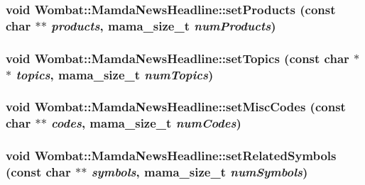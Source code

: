 \hypertarget{classWombat_1_1MamdaNewsHeadline_945dfa7210ec4375fad51c8657b0f96c}{
\subsubsection[setProducts]{\setlength{\rightskip}{0pt plus 5cm}void Wombat::Mamda\-News\-Headline::set\-Products (const char $\ast$$\ast$ {\em products}, mama\_\-size\_\-t {\em num\-Products})}}
\label{classWombat_1_1MamdaNewsHeadline_945dfa7210ec4375fad51c8657b0f96c}


\hypertarget{classWombat_1_1MamdaNewsHeadline_ba36d23a26fe7381aa2646834fb8c747}{
\subsubsection[setTopics]{\setlength{\rightskip}{0pt plus 5cm}void Wombat::Mamda\-News\-Headline::set\-Topics (const char $\ast$$\ast$ {\em topics}, mama\_\-size\_\-t {\em num\-Topics})}}
\label{classWombat_1_1MamdaNewsHeadline_ba36d23a26fe7381aa2646834fb8c747}


\hypertarget{classWombat_1_1MamdaNewsHeadline_66581c6c415139a8f34bb1179b4d601e}{
\subsubsection[setMiscCodes]{\setlength{\rightskip}{0pt plus 5cm}void Wombat::Mamda\-News\-Headline::set\-Misc\-Codes (const char $\ast$$\ast$ {\em codes}, mama\_\-size\_\-t {\em num\-Codes})}}
\label{classWombat_1_1MamdaNewsHeadline_66581c6c415139a8f34bb1179b4d601e}


\hypertarget{classWombat_1_1MamdaNewsHeadline_ebf0896a313c8c2007e1ffdf03f0649f}{
\subsubsection[setRelatedSymbols]{\setlength{\rightskip}{0pt plus 5cm}void Wombat::Mamda\-News\-Headline::set\-Related\-Symbols (const char $\ast$$\ast$ {\em symbols}, mama\_\-size\_\-t {\em num\-Symbols})}}
\label{classWombat_1_1MamdaNewsHeadline_ebf0896a313c8c2007e1ffdf03f0649f}


